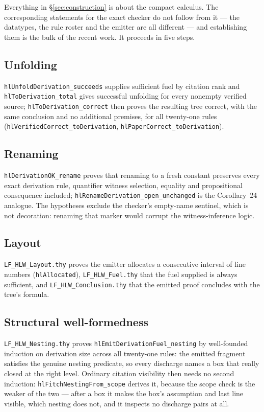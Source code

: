 \documentclass[11pt]{article}
\theoremstyle{plain}
\newcommand{\ubrk}{\_\discretionary{}{}{}}
\newcommand{\isa}[1]{\textup{\texttt{\small #1}}}
\newcommand{\thy}[1]{\textup{\texttt{\small #1}}}
\begin{document}
Everything in \S\ref{sec:construction} is about the compact calculus. The
corresponding statements for the exact checker do not follow from it --- the
datatypes, the rule roster and the emitter are all different --- and
establishing them is the bulk of the recent work. It proceeds in five steps.

\subsection{Unfolding}
\isa{hlUnfoldDerivation\ubrk{}succeeds} supplies sufficient fuel by citation rank and
\isa{hlToDerivation\ubrk{}total} gives successful unfolding for every nonempty
verified source; \isa{hlToDerivation\ubrk{}correct} then proves the resulting tree
correct, with the same conclusion and no additional premises, for all
twenty-one rules (\isa{hlVerifiedCorrect\ubrk{}toDerivation},
\isa{hlPaperCorrect\ubrk{}toDerivation}).

\subsection{Renaming}
\isa{hlDerivationOK\ubrk{}rename} proves that renaming to a fresh constant preserves
every exact derivation rule, quantifier witness selection, equality and
propositional consequence included; \isa{hlRenameDerivation\ubrk{}open\ubrk{}unchanged}
is the Corollary~24 analogue. The hypotheses exclude the checker's empty-name
sentinel, which is not decoration: renaming that marker would corrupt the
witness-inference logic.

\subsection{Layout}
\thy{LF\ubrk{}HLW\ubrk{}Layout.thy} proves the emitter allocates a consecutive interval of
line numbers (\isa{hlAllocated}), \thy{LF\ubrk{}HLW\ubrk{}Fuel.thy} that the fuel supplied
is always sufficient, and \thy{LF\ubrk{}HLW\ubrk{}Conclusion.thy} that the emitted proof
concludes with the tree's formula.

\subsection{Structural well-formedness}
\thy{LF\ubrk{}HLW\ubrk{}Nesting.thy} proves \isa{hlEmitDerivationFuel\ubrk{}nesting} by
well-founded induction on derivation size across all twenty-one rules: the
emitted fragment satisfies the genuine nesting predicate, so every discharge
names a box that really closed at the right level. Ordinary citation visibility
then needs no second induction: \isa{hlFitchNestingFrom\ubrk{}scope} derives it,
because the scope check is the weaker of the two --- after a box it makes the
box's assumption and last line visible, which nesting does not, and it inspects
no discharge pairs at all.
\end{document}
